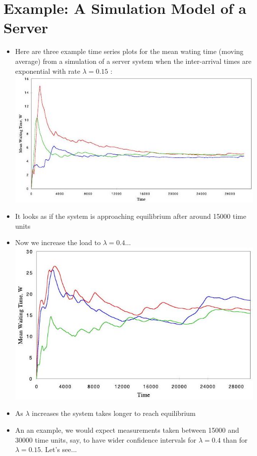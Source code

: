 \documentclass[10pt]{article}
\begin{document}
\section*{Example: A Simulation Model of a Server}
\begin{itemize}
  \item Here are three example time series plots for the mean wating time (moving average) from a simulation of a server system when the inter-arrival times are exponential with rate $\lambda=0.15$ :\\
\includegraphics[max width=\textwidth, center]{2025_05_12_520db7cd238ba7b44f0fg-28}
  \item It looks as if the system is approaching equilibrium after around 15000 time units
  \item Now we increase the load to $\lambda=0.4 \ldots$\\
\includegraphics[max width=\textwidth, center]{2025_05_12_520db7cd238ba7b44f0fg-29}
  \item As $\lambda$ increases the system takes longer to reach equilibrium
  \item An an example, we would expect measurements taken between 15000 and 30000 time units, say, to have wider confidence intervals for $\lambda=0.4$ than for $\lambda=0.15$. Let's see...
\end{itemize}
\end{document}
